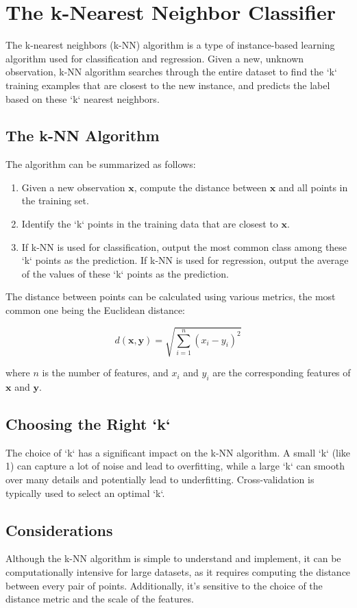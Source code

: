 \chapter{The k-Nearest Neighbor Classifier}

The k-nearest neighbors (k-NN) algorithm is a type of instance-based
learning algorithm used for classification and regression. Given a
new, unknown observation, k-NN algorithm searches through the entire
dataset to find the `k` training examples that are closest to the new
instance, and predicts the label based on these `k` nearest neighbors.

\section{The k-NN Algorithm}

The algorithm can be summarized as follows:

\begin{enumerate}
    \item Given a new observation $\mathbf{x}$, compute the distance
      between $\mathbf{x}$ and all points in the training set.
    \item Identify the `k` points in the training data that are
      closest to $\mathbf{x}$.
    \item If k-NN is used for classification, output the most common
      class among these `k` points as the prediction. If k-NN is used
      for regression, output the average of the values of these `k`
      points as the prediction.
\end{enumerate}

The distance between points can be calculated using various metrics,
the most common one being the Euclidean distance:

\[
d(\mathbf{x}, \mathbf{y}) = \sqrt{\sum_{i=1}^{n}(x_i - y_i)^2}
\]

where $n$ is the number of features, and $x_i$ and $y_i$ are the
corresponding features of $\mathbf{x}$ and $\mathbf{y}$.

\section{Choosing the Right `k`}

The choice of `k` has a significant impact on the k-NN algorithm. A
small `k` (like 1) can capture a lot of noise and lead to overfitting,
while a large `k` can smooth over many details and potentially lead to
underfitting. Cross-validation is typically used to select an optimal
`k`.

\section{Considerations}

Although the k-NN algorithm is simple to understand and implement, it
can be computationally intensive for large datasets, as it requires
computing the distance between every pair of points. Additionally,
it's sensitive to the choice of the distance metric and the scale of
the features.

